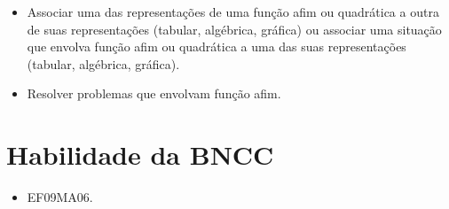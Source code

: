 \begin{escolha}
\begin{boxmedio}
\begin{boxmedio}
{\begin{boxpeq}
\begin{boxpeq}
{\begin{boxpeq}
\begin{boxmedio}
\begin{boxmedio}
\begin{boxpeq}
\begin{boxmedio}
\begin{boxpeq}
\begin{boxpeq}
\begin{boxpeq}
\begin{boxpeq}
\begin{boxmedio}
{\begin{boxmedio}
\begin{boxmedio}
\begin{boxpeq}
\begin{boxmedio}
\begin{boxpeq}
\begin{boxpeq}
\begin{boxpeq}
\begin{escolha}
{\begin{boxmedio}
\begin{boxpeq}
\begin{boxpeq}
\begin{boxpeq}
\begin{boxpeq}
\begin{boxpeq}
\begin{boxmedio}
\begin{boxpeq}
\begin{boxpeq}
\begin{boxpeq}
{\begin{boxpeq}
\begin{boxmedio}
\begin{boxpeq}
\begin{boxpeq}
\begin{boxpeq}
{\begin{boxpeq}
\begin{boxmedio}
\begin{itemize}

  \item Associar uma das representações de uma função afim ou quadrática a
outra de suas representações (tabular, algébrica, gráfica) ou associar uma
situação que envolva função afim ou quadrática a uma das suas
representações (tabular, algébrica, gráfica).
  \item Resolver problemas que envolvam função afim.  

\end{itemize} 

\section{Habilidade da BNCC}

\begin{itemize}
  \item EF09MA06.
\end{itemize}

\end{boxmedio}
\end{boxpeq}}
\end{boxpeq}
\end{boxpeq}
\end{boxpeq}
\end{boxmedio}
\end{boxpeq}}
\end{boxpeq}
\end{boxpeq}
\end{boxpeq}
\end{boxmedio}
\end{boxpeq}
\end{boxpeq}
\end{boxpeq}
\end{boxpeq}
\end{boxpeq}
\end{boxmedio}}
\end{escolha}
\end{boxpeq}
\end{boxpeq}
\end{boxpeq}
\end{boxmedio}
\end{boxpeq}
\end{boxmedio}
\end{boxmedio}}
\end{boxmedio}
\end{boxpeq}
\end{boxpeq}
\end{boxpeq}
\end{boxpeq}
\end{boxmedio}
\end{boxpeq}
\end{boxmedio}
\end{boxmedio}
\end{boxpeq}}
\end{boxpeq}
\end{boxpeq}}
\end{boxmedio}
\end{boxmedio}
\end{escolha}
